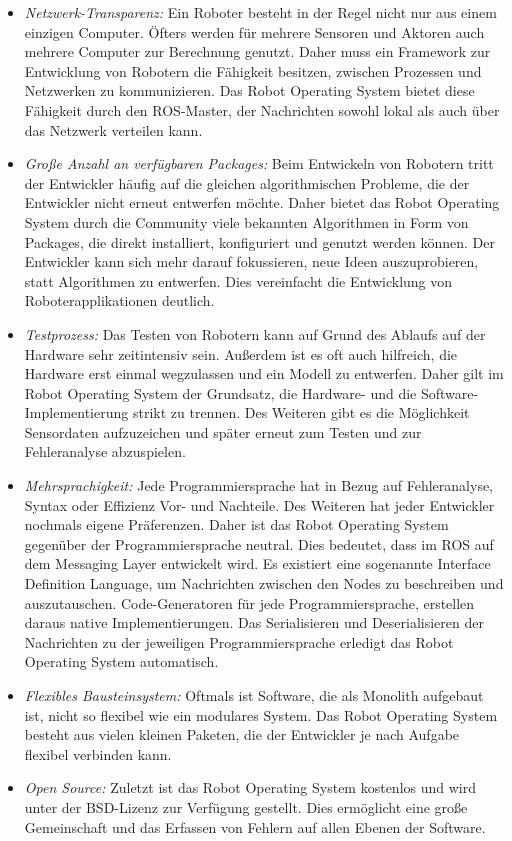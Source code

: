 \begin{itemize}
  \item \textit{Netzwerk-Transparenz:} Ein Roboter besteht in der Regel nicht nur aus einem einzigen Computer. Öfters werden für mehrere Sensoren und Aktoren auch mehrere Computer zur Berechnung genutzt. Daher muss ein Framework zur Entwicklung von Robotern die Fähigkeit besitzen, zwischen Prozessen und Netzwerken zu kommunizieren. Das Robot Operating System bietet diese Fähigkeit durch den \ac{ROS}-Master, der Nachrichten sowohl lokal als auch über das Netzwerk verteilen kann.
  \item \textit{Große Anzahl an verfügbaren Packages:} Beim Entwickeln von Robotern tritt der Entwickler häufig auf die gleichen algorithmischen Probleme, die der Entwickler nicht erneut entwerfen möchte. Daher bietet das Robot Operating System durch die Community viele bekannten Algorithmen in Form von Packages, die direkt installiert, konfiguriert und genutzt werden können. Der Entwickler kann sich mehr darauf fokussieren, neue Ideen auszuprobieren, statt Algorithmen zu entwerfen. Dies vereinfacht die Entwicklung von Roboterapplikationen deutlich.
  \item \textit{Testprozess:} Das Testen von Robotern kann auf Grund des Ablaufs auf der Hardware sehr zeitintensiv sein. Außerdem ist es oft auch hilfreich, die Hardware erst einmal wegzulassen und ein Modell zu entwerfen. Daher gilt im Robot Operating System der Grundsatz, die Hardware- und die Software-Implementierung strikt zu trennen. Des Weiteren gibt es die Möglichkeit Sensordaten aufzuzeichen und später erneut zum Testen und zur Fehleranalyse abzuspielen.
  \item \textit{Mehrsprachigkeit:} Jede Programmiersprache hat in Bezug auf Fehleranalyse, Syntax oder Effizienz Vor- und Nachteile. Des Weiteren hat jeder Entwickler nochmals eigene Präferenzen. Daher ist das Robot Operating System gegenüber der Programmiersprache neutral. Dies bedeutet, dass im \ac{ROS} auf dem Messaging Layer entwickelt wird. Es existiert eine sogenannte Interface Definition Language, um Nachrichten zwischen den Nodes zu beschreiben und auszutauschen. Code-Generatoren für jede Programmiersprache, erstellen daraus native Implementierungen. Das Serialisieren und Deserialisieren der Nachrichten zu der jeweiligen Programmiersprache erledigt das Robot Operating System automatisch.
  \item \textit{Flexibles Bausteinsystem:} Oftmals ist Software, die als Monolith aufgebaut ist, nicht so flexibel wie ein modulares System. Das Robot Operating System besteht aus vielen kleinen Paketen, die der Entwickler je nach Aufgabe flexibel verbinden kann.
  \item \textit{Open Source:} Zuletzt ist das Robot Operating System kostenlos und wird unter der BSD-Lizenz zur Verfügung gestellt. Dies ermöglicht eine große Gemeinschaft und das Erfassen von Fehlern auf allen Ebenen der Software.
\end{itemize}

